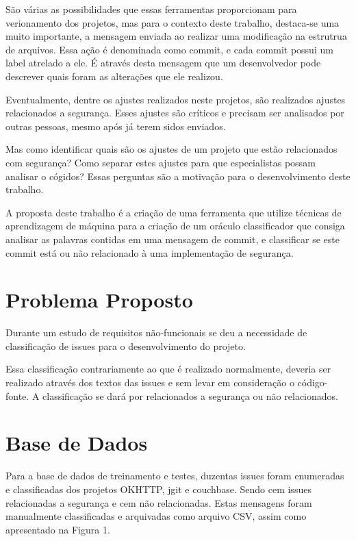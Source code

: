 \documentclass[conference]{IEEEtran}
\begin{document}
São várias as possibilidades que essas ferramentas proporcionam para verionamento dos projetos, mas para o contexto deste trabalho, destaca-se uma muito importante, a mensagem enviada ao realizar uma modificação na estrutrua de arquivos. Essa ação é denominada como commit, e cada commit possui um label atrelado a ele. É através desta mensagem que um desenvolvedor pode descrever quais foram as alterações que ele realizou.

Eventualmente, dentre os ajustes realizados neste projetos, são realizados ajustes relacionados a segurança. Esses ajustes são críticos e precisam ser analisados por outras pessoas, mesmo após já terem sidos enviados.

Mas como identificar quais são os ajustes de um projeto que estão relacionados com segurança? Como separar estes ajustes para que especialistas possam analisar o cógidos? Essas perguntas são a motivação para o desenvolvimento deste trabalho.

A proposta deste trabalho é a criação de uma ferramenta que utilize técnicas de aprendizagem de máquina para a criação de um oráculo classificador que consiga analisar as palavras contidas em uma mensagem de commit, e classificar se este commit está ou não relacionado à uma implementação de segurança.

\section{Problema Proposto}

Durante um estudo de requisitos não-funcionais se deu a necessidade de classificação de issues para o desenvolvimento do projeto.

Essa classificação contrariamente ao que é realizado normalmente, deveria ser realizado através dos textos das issues e sem levar em consideração o código-fonte. A classificação se dará por relacionados a segurança ou não relacionados.

\section{Base de Dados}

Para a base de dados de treinamento e testes, duzentas issues foram enumeradas e classificadas dos projetos OKHTTP, jgit e couchbase. Sendo cem issues relacionadas a segurança e cem não relacionadas. Estas mensagens foram manualmente classificadas e arquivadas como arquivo CSV, assim como apresentado na Figura 1.
\end{document}
